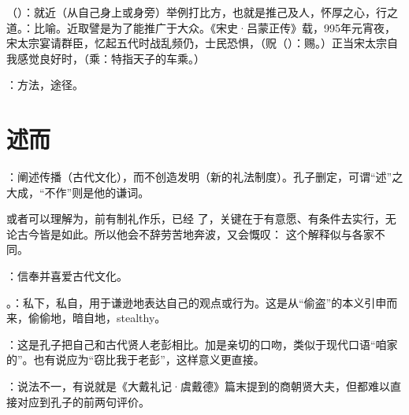 {\item {}（）：就近（从自己身上或身旁）举例打比方，也就是推己及人，怀厚之心，行之道。：比喻。近取譬是为了能推广于大众。《宋史·吕蒙正传》载，995年元宵夜，宋太宗宴请群臣，忆起五代时战乱频仍，士民恐惧，（贶（）：赐。）正当宋太宗自我感觉良好时，（乘：特指天子的车乘。）
\item {}：方法，途径。
}
{}



\chapter{述而}

{
\item {}：阐述传播（古代文化），而不创造发明（新的礼法制度）。孔子删定，可谓“述”之大成，“不作”则是他的谦词。

或者可以理解为，前有制礼作乐，已经  了，关键在于有意愿、有条件去实行，无论古今皆是如此。所以他会不辞劳苦地奔波，又会慨叹： 这个解释似与各家不同。

\item {}：信奉并喜爱古代文化。

\item {}。：私下，私自，用于谦逊地表达自己的观点或行为。这是从“偷盗”的本义引申而来，偷偷地，暗自地，stealthy。

：这是孔子把自己和古代贤人老彭相比。加是亲切的口吻，类似于现代口语“咱家的”。也有说应为“窃比我于老彭”，这样意义更直接。

：说法不一，有说就是《大戴礼记·虞戴德》篇末提到的商朝贤大夫，但都难以直接对应到孔子的前两句评价。
}
{}


